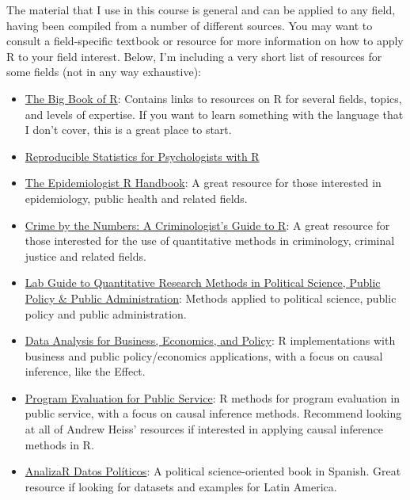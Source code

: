 \documentclass[
  letterpaper,
  DIV=11,
  numbers=noendperiod]{scrartcl}
\begin{document}
The material that I use in this course is general and can be applied to
any field, having been compiled from a number of different sources. You
may want to consult a field-specific textbook or resource for more
information on how to apply R to your field interest. Below, I'm
including a very short list of resources for some fields (not in any way
exhaustive):

\begin{itemize}
\item
  \href{https://www.bigbookofr.com/}{The Big Book of R}: Contains links
  to resources on R for several fields, topics, and levels of expertise.
  If you want to learn something with the language that I don't cover,
  this is a great place to start.
\item
  \href{https://www.crumplab.com/rstatsforpsych/index.html}{Reproducible
  Statistics for Psychologists with R}
\item
  \href{https://epirhandbook.com/}{The Epidemiologist R Handbook}: A
  great resource for those interested in epidemiology, public health and
  related fields.
\item
  \href{https://www.crimebythenumbers.com/}{Crime by the Numbers: A
  Criminologist's Guide to R}: A great resource for those interested for
  the use of quantitative methods in criminology, criminal justice and
  related fields.
\item
  \href{https://bookdown.org/ripberjt/labbook/}{Lab Guide to
  Quantitative Research Methods in Political Science, Public Policy \&
  Public Administration}: Methods applied to political science, public
  policy and public administration.
\item
  \href{https://gabors-data-analysis.com/}{Data Analysis for Business,
  Economics, and Policy}: R implementations with business and public
  policy/economics applications, with a focus on causal inference, like
  the Effect.
\item
  \href{https://evalsp24.classes.andrewheiss.com/}{Program Evaluation
  for Public Service}: R methods for program evaluation in public
  service, with a focus on causal inference methods. Recommend looking
  at all of Andrew Heiss' resources if interested in applying causal
  inference methods in R.
\item
  \href{https://arcruz0.github.io/libroadp/index.html}{AnalizaR Datos
  Políticos}: A political science-oriented book in Spanish. Great
  resource if looking for datasets and examples for Latin America.
\end{itemize}
\end{document}

